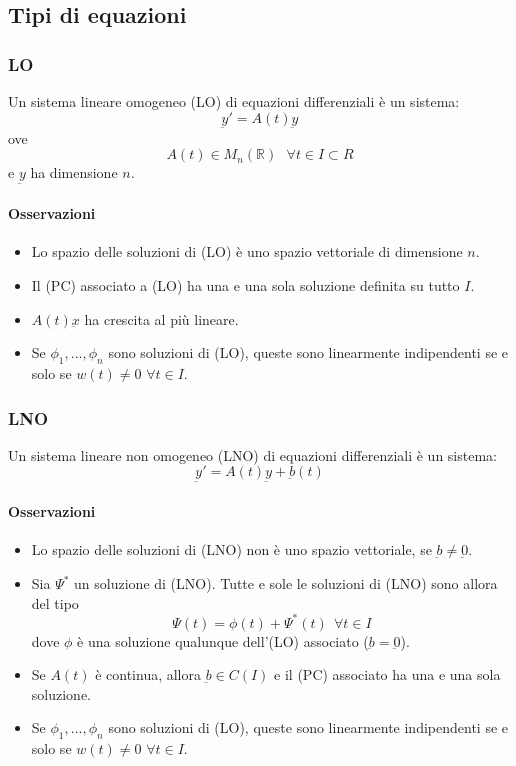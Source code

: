 \documentclass[a4paper,12pt]{article}
\begin{document}
\subsection{Tipi di equazioni}
\subsubsection{LO}
Un sistema lineare omogeneo (LO) di equazioni differenziali è un sistema:
$$\underbar{y}' = A(t)\underbar{y}$$
ove $$A(t)\in M_n(\mathbb{R})\ \ \ \forall t\in I\subset R$$ e $\underbar{y}$ ha dimensione $n$.
\paragraph{Osservazioni}
\begin{itemize}
 \item Lo spazio delle soluzioni di (LO) è uno spazio vettoriale di dimensione $n$.
 \item Il (PC) associato a (LO) ha una e una sola soluzione definita su tutto $I$.
 \item $A(t)\underbar{x}$ ha crescita al più lineare.
 \item Se $\phi_1,...,\phi_n$ sono soluzioni di (LO), queste sono linearmente indipendenti se e solo se $w(t)\neq0$ $\forall t \in I$.
\end{itemize}

\subsubsection{LNO}
Un sistema lineare non omogeneo (LNO) di equazioni differenziali è un sistema:
$$\underbar{y}' = A(t)\underbar{y} + \underbar{b}(t)$$
\paragraph{Osservazioni}
\begin{itemize}
 \item Lo spazio delle soluzioni di (LNO) non è uno spazio vettoriale, se $\underbar{b}\neq\underbar{0}$.
 \item Sia $\Psi^*$ un soluzione di (LNO). Tutte e sole le soluzioni di (LNO) sono allora del tipo
       $$ \Psi(t) = \phi(t) + \Psi^*(t)\ \ \forall t \in I$$
       dove $\phi$ è una soluzione qualunque dell'(LO) associato ($\underbar{b}=\underbar{0}$).
 \item Se $A(t)$ è continua, allora $\underbar{b}\in C(I)$ e il (PC) associato ha una e una sola soluzione.
 \item Se $\phi_1,...,\phi_n$ sono soluzioni di (LO), queste sono linearmente indipendenti se e solo se $w(t)\neq0$ $\forall t \in I$.
\end{itemize}
\end{document}
